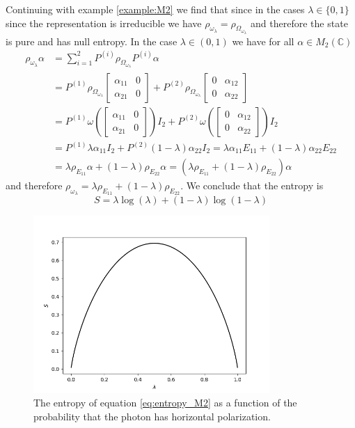 \begin{example}
Continuing with example \ref{example:M2} we find that since in the cases $\lambda\in\{0,1\}$ since the representation is irreducible we have $\rho_{\omega_\lambda}=\rho_{\Omega_{\omega_\lambda}}$ and therefore the state is pure and has null entropy. In the case $\lambda\in (0,1)$ we have for all $\alpha\in M_2(\mathbb{C})$
\begin{align}
\rho_{\omega_\lambda}\alpha &= \sum_{i=1}^2 P^{(i)}\rho_{\Omega_{\omega_\lambda}}P^{(i)}\alpha \\
& = P^{(1)}\rho_{\Omega_{\omega_\lambda}}\begin{bmatrix}
\alpha_{11} & 0 \\
\alpha_{21} & 0 
\end{bmatrix} + P^{(2)}\rho_{\Omega_{\omega_\lambda}}\begin{bmatrix}
0 & \alpha_{12} \\
0 & \alpha_{22} 
\end{bmatrix} \\
& = P^{(1)}\omega\left(\begin{bmatrix}
\alpha_{11} & 0 \\
\alpha_{21} & 0 
\end{bmatrix} \right)I_2 + P^{(2)}\omega\left(\begin{bmatrix}
0 & \alpha_{12} \\
0 & \alpha_{22} 
\end{bmatrix} \right)I_2 \\
&= P^{(1)}\lambda\alpha_{11}I_2 + P^{(2)}(1-\lambda)\alpha_{22}I_2 =\lambda\alpha_{11} E_{11} + (1-\lambda)\alpha_{22}E_{22} \\
& = \lambda\rho_{E_{11}}\alpha + (1-\lambda)\rho_{E_{22}}\alpha = (\lambda\rho_{E_{11}} + (1-\lambda)\rho_{E_{22}})\alpha
\end{align} 
and therefore $\rho_{\omega_\lambda}=\lambda\rho_{E_{11}} + (1-\lambda)\rho_{E_{22}}$.
We conclude that the entropy is 
\begin{equation}\label{eq:entropy_M2}
S = \lambda\log (\lambda) + (1-\lambda)\log(1-\lambda)
\end{equation}
\begin{figure}
\centering
\includegraphics[width=0.8\textwidth]{entropia_M2.png}
\caption{The entropy of equation \ref{eq:entropy_M2} as a function of the probability that the photon has horizontal polarization.}
\end{figure}
\end{example}